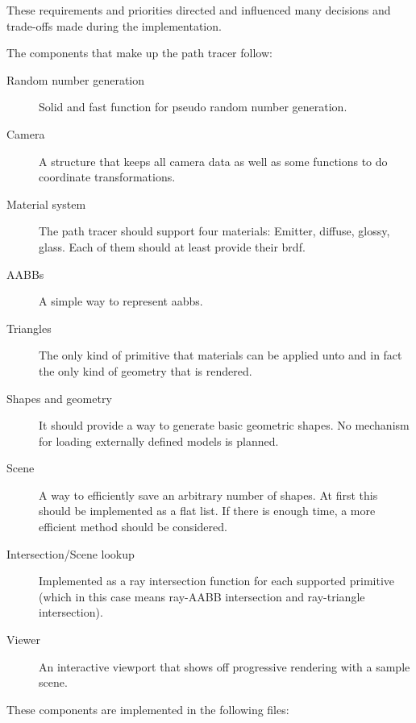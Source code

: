\documentclass[
  twoside,
  11pt, a4paper,
  footinclude=true,
  headinclude=true,
  cleardoublepage=empty
]{scrreprt}
\begin{document}
These requirements and priorities directed and
influenced many decisions and trade-offs made during the implementation.

The components that make up the path tracer follow:

\begin{description}
    \item[Random number generation] Solid and fast function for pseudo random number generation.
    \item[Camera] A structure that keeps all camera data as well as some functions to do coordinate
        transformations.
    \item[Material system] The path tracer should support four materials: Emitter, diffuse, glossy,
        glass. Each of them should at least provide their \ac{brdf}.
    \item[AABBs] A simple way to represent \acp{aabb}.
    \item[Triangles] The only kind of primitive that materials can be applied unto and in fact the
        only kind of geometry that is rendered.
    \item[Shapes and geometry] It should provide a way to generate basic geometric shapes. No
        mechanism for loading externally defined models is planned.
    \item[Scene] A way to efficiently save an arbitrary number of shapes. At first this should be
        implemented as a flat list. If there is enough time, a more efficient method should be
        considered.
    \item[Intersection/Scene lookup] Implemented as a ray intersection function for each supported primitive
        (which in this case means ray-AABB intersection and ray-triangle intersection).
    \item[Viewer] An interactive viewport that shows off progressive rendering with a sample scene.
\end{description}

These components are implemented in the following files:
\end{document}
